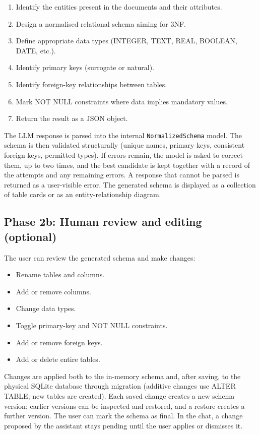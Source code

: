 \documentclass[11pt,a4paper]{article}
\begin{document}
\begin{enumerate}
  \item Identify the entities present in the documents and their attributes.
  \item Design a normalised relational schema aiming for 3NF.
  \item Define appropriate data types (INTEGER, TEXT, REAL, BOOLEAN, DATE, etc.).
  \item Identify primary keys (surrogate or natural).
  \item Identify foreign-key relationships between tables.
  \item Mark NOT NULL constraints where data implies mandatory values.
  \item Return the result as a JSON object.
\end{enumerate}

The LLM response is parsed into the internal \texttt{NormalizedSchema} model. The schema is then validated structurally (unique names, primary keys, consistent foreign keys, permitted types). If errors remain, the model is asked to correct them, up to two times, and the best candidate is kept together with a record of the attempts and any remaining errors. A response that cannot be parsed is returned as a user-visible error. The generated schema is displayed as a collection of table cards or as an entity-relationship diagram.

\subsection{Phase 2b: Human review and editing (optional)}
The user can review the generated schema and make changes:
\begin{itemize}
  \item Rename tables and columns.
  \item Add or remove columns.
  \item Change data types.
  \item Toggle primary-key and NOT NULL constraints.
  \item Add or remove foreign keys.
  \item Add or delete entire tables.
\end{itemize}
Changes are applied both to the in-memory schema and, after saving, to the physical SQLite database through migration (additive changes use ALTER TABLE; new tables are created). Each saved change creates a new schema version; earlier versions can be inspected and restored, and a restore creates a further version. The user can mark the schema as final. In the chat, a change proposed by the assistant stays pending until the user applies or dismisses it.
\end{document}
